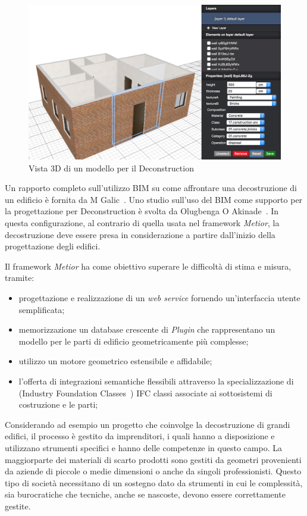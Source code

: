 \begin{figure}[htbp] %
   \centering
   \includegraphics[width=1\linewidth]{images/3d-sel}
   \caption{Vista 3D di un modello per il Deconstruction}
   \label{fig:augmented}
\end{figure}

Un rapporto completo sull'utilizzo BIM su come affrontare una decostruzione di un edificio è fornita da M Galic~\cite{galic2014bim}.
Uno studio sull'uso del BIM come supporto per la progettazione per Deconstruction è svolta da Olugbenga O Akinade~\cite{akinade2015waste}.
In questa configurazione, al contrario di quella usata nel framework \emph{Metior}, la decostruzione deve essere
presa in considerazione a partire dall'inizio della progettazione degli edifici.
\newpage


Il framework \emph{Metior} ha come obiettivo superare le difficoltà di stima e misura, tramite:
\begin{itemize}
  \item progettazione e realizzazione di un \emph{web service} fornendo un'interfaccia utente semplificata;
  \item memorizzazione un database crescente di \emph{Plugin} che rappresentano un modello per le parti di edificio geometricamente più complesse;
  \item utilizzo un motore geometrico estensibile e affidabile;
  \item l'offerta di integrazioni semantiche flessibili attraverso la specializzazione di (Industry Foundation Classes~\cite{ifc})
        IFC classi associate ai sottosistemi di costruzione e le parti;
\end{itemize}

Considerando ad esempio un progetto che coinvolge la decostruzione di grandi edifici, il processo è
gestito da imprenditori, i quali hanno a disposizione e utilizzano strumenti specifici e hanno delle competenze in questo campo.
La maggiorparte dei materiali di scarto prodotti sono gestiti da geometri provenienti da aziende di piccole o medie dimensioni
o anche da singoli professionisti.
Questo tipo di società necessitano di un sostegno dato da strumenti in cui le complessità,
sia burocratiche che tecniche, anche se nascoste, devono essere correttamente gestite.
\newpage

